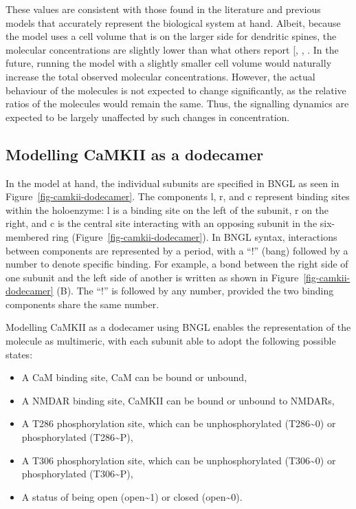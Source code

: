 \documentclass[
  11pt,
  letterpaper,
]{scrreprt}
\providecommand{\tightlist}{%
  \setlength{\itemsep}{0pt}\setlength{\parskip}{0pt}}\usepackage{longtable,booktabs,array}
\begin{document}
These values are consistent with those found in the literature and
previous models that accurately represent the biological system at hand.
Albeit, because the model uses a cell volume that is on the larger side
for dendritic spines, the molecular concentrations are slightly lower
than what others report {[},
,
\citeproc{ref-yasuda2022CaMKIIa}{448}{]}. In the future, running the
model with a slightly smaller cell volume would naturally increase the
total observed molecular concentrations. However, the actual behaviour
of the molecules is not expected to change significantly, as the
relative ratios of the molecules would remain the same. Thus, the
signalling dynamics are expected to be largely unaffected by such
changes in concentration.

\subsection{Modelling CaMKII as a
dodecamer}\label{sec-camkii-as-dodecamer}

In the model at hand, the individual subunits are specified in BNGL as
seen in Figure~\ref{fig-camkii-dodecamer}. The components l, r, and c
represent binding sites within the holoenzyme: l is a binding site on
the left of the subunit, r on the right, and c is the central site
interacting with an opposing subunit in the six-membered ring
(Figure~\ref{fig-camkii-dodecamer}). In BNGL syntax, interactions
between components are represented by a period, with a ``!'' (bang)
followed by a number to denote specific binding. For example, a bond
between the right side of one subunit and the left side of another is
written as shown in Figure~\ref{fig-camkii-dodecamer} (B). The ``!'' is
followed by any number, provided the two binding components share the
same number.

Modelling CaMKII as a dodecamer using BNGL enables the representation of
the molecule as multimeric, with each subunit able to adopt the
following possible states:

\begin{itemize}
\tightlist
\item
  A CaM binding site, CaM can be bound or unbound,
\item
  A NMDAR binding site, CaMKII can be bound or unbound to NMDARs,
\item
  A T286 phosphorylation site, which can be unphosphorylated
  (T286\textasciitilde0) or phosphorylated (T286\textasciitilde P),
\item
  A T306 phosphorylation site, which can be unphosphorylated
  (T306\textasciitilde0) or phosphorylated (T306\textasciitilde P),
\item
  A status of being open (open\textasciitilde1) or closed
  (open\textasciitilde0).
\end{itemize}
\end{document}
